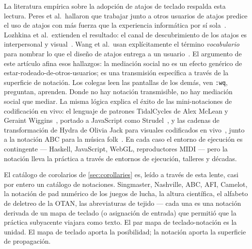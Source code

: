 \documentclass[10pt,letterpaper,twocolumn]{article}
\begin{document}
La literatura empírica sobre la adopción de atajos de teclado respalda esta lectura. Peres et al.\ hallaron que trabajar junto a otros usuarios de atajos predice el uso de atajos con más fuerza que la experiencia informática por sí sola~\citep{peres2004shortcut}. Lozhkina et al.\ extienden el resultado: el canal de descubrimiento de los atajos es interpersonal y visual~\citep{lozhkina2025discovery}. Wang et al.\ usan explícitamente el término \emph{vocabulario} para nombrar lo que el diseño de atajos entrega a un usuario~\citep{wang2020keymap}. El argumento de este artículo afina esos hallazgos: la mediación social no es un efecto genérico de estar-rodeado-de-otros-usuarios; es una transmisión específica a través de la superficie de notación. Los colegas leen las pantallas de los demás, ven \texttt{:wq}, preguntan, aprenden. Donde no hay notación transmisible, no hay mediación social que mediar. La misma lógica explica el éxito de las mini-notaciones de codificación en vivo: el lenguaje de patrones TidalCycles de Alex McLean y Geraint Wiggins~\citep{mclean2010tidal}, portado a JavaScript como Strudel~\citep{roos2023strudel}, y las cadenas de transformación de Hydra de Olivia Jack para visuales codificados en vivo~\citep{jack2018hydra}, junto a la notación ABC para la música folk~\citep{walshaw_abc}. En cada caso el entorno de ejecución es contingente --- Haskell, JavaScript, WebGL, reproductores MIDI --- pero la notación lleva la práctica a través de entornos de ejecución, talleres y décadas.

El catálogo de corolarios de \textsection\ref{sec:corollaries} es, leído a través de esta lente, casi por entero un catálogo de notaciones. Singmaster, Nashville, ABC, AFI, Camelot, la notación de pad numérico de los juegos de lucha, la altura científica, el alfabeto de deletreo de la OTAN, las abreviaturas de tejido --- cada una es una notación derivada de un mapa de teclado (o asignación de entrada) que permitió que la práctica subyacente viajara como texto. El par mapa de teclado-notación es la unidad. El mapa de teclado aporta la posibilidad; la notación aporta la superficie de propagación.
\end{document}
